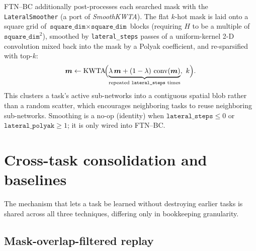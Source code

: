 \documentclass[11pt]{article}
\newcommand{\mask}{\bm{m}}                 %
\newcommand{\Ho}{H}                        %
\newcommand{\kk}{k}                        %
\newcommand{\kwta}{\operatorname{KWTA}}
\newcommand{\code}[1]{\texttt{\small #1}}
\begin{document}
FTN--BC additionally post-processes each searched mask with the
\code{LateralSmoother} (a port of \emph{SmoothKWTA}). The flat $\kk$-hot mask is
laid onto a square grid of $\texttt{square\_dim}\times\texttt{square\_dim}$ blocks
(requiring $\Ho$ to be a multiple of $\texttt{square\_dim}^2$), smoothed by
\code{lateral\_steps} passes of a uniform-kernel 2-D convolution mixed back into
the mask by a Polyak coefficient, and re-sparsified with top-$\kk$:
\[
\mask \gets \kwta\!\Bigl(\underbrace{\lambda\,\mask + (1-\lambda)\,\operatorname{conv}(\mask)}_{\text{repeated \texttt{lateral\_steps} times}},\ \kk\Bigr).
\]
This clusters a task's active sub-networks into a contiguous spatial blob rather
than a random scatter, which encourages neighboring tasks to reuse neighboring
sub-networks. Smoothing is a no-op (identity) when
$\texttt{lateral\_steps}\le 0$ or $\texttt{lateral\_polyak}\ge 1$; it is only
wired into FTN--BC.

\section{Cross-task consolidation and baselines}
\label{sec:consolidation}

The mechanism that lets a task be learned without destroying earlier tasks is
shared across all three techniques, differing only in bookkeeping granularity.

\subsection{Mask-overlap-filtered replay}
\end{document}
